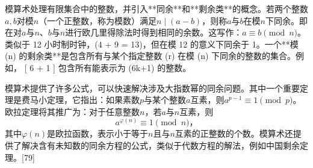 模算术处理有限集合中的整数，并引入**同余**和**剩余类**的概念。若两个整数$a, b$对模$n$（一个正整数，称为模数）满足$n \mid (a-b)$，则称$a$与$b$在模$n$下同余。即在对$a$与$n$、$b$与$n$进行欧几里得除法时得到相同的余数。这写作：$a \equiv b \pmod{n}$。类似于 12 小时制时钟，(4 + 9 = 13)，但在模 12 的意义下同余于 1。一个**模 (n) 的剩余类**是包含所有与某个指定整数 (r) 在模 (n) 下同余的整数的集合。例如，
[
6 + 1
]
包含所有能表示为 (6k+1) 的整数。

模算术提供了许多公式，可以快速解决涉及大指数幂的同余问题。其中一个重要定理是费马小定理，它指出：如果素数$p$与某个整数$a$互素，则$a^{p-1} \equiv 1 \pmod{p}$。欧拉定理将其推广为：对于任意整数$n$，若$a$与$n$互素，则
$$
a^{\varphi(n)} \equiv 1 \pmod{n}，
$$
其中$\varphi(n)$是欧拉函数，表示小于等于$n$且与$n$互素的正整数的个数。模算术还提供了解决含有未知数的同余方程的公式，类似于代数方程的解法，例如中国剩余定理。[79]
